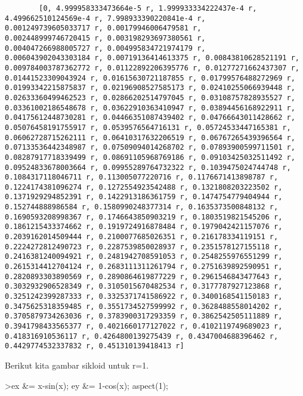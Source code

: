 \documentclass[
]{book}
\begin{document}
\begin{verbatim}
        [0, 4.999958333473664e-5 r, 1.999933334222437e-4 r, 
4.499662510124569e-4 r, 7.998933390220841e-4 r, 
0.001249739605033717 r, 0.00179946006479581 r, 
0.002448999746720415 r, 0.003198293697380561 r, 
0.004047266988005727 r, 0.004995834721974179 r, 
0.006043902043303184 r, 0.00719136414613375 r, 0.00843810628521191 r, 
0.009784003787362772 r, 0.01122892206395776 r, 0.01277271662437307 r, 
0.01441523309043924 r, 0.01615630721187855 r, 0.01799576488272969 r, 
0.01993342215875837 r, 0.02196908527585173 r, 0.02410255066939448 r, 
0.02633360499462523 r, 0.02866202514797045 r, 0.03108757828935527 r, 
0.03361002186548678 r, 0.03622910363410947 r, 0.03894456168922911 r, 
0.04175612448730281 r, 0.04466351087439402 r, 0.04766643011428662 r, 
0.05076458191755917 r, 0.0539576564716131 r, 0.05724533447165381 r, 
0.06062728715262111 r, 0.06410317632206519 r, 0.06767265439396564 r, 
0.07133536442348987 r, 0.07509094014268702 r, 0.07893900599711501 r, 
0.08287917718339499 r, 0.08691105968769186 r, 0.09103425032511492 r, 
0.09524833678003664 r, 0.09955289764732322 r, 0.1039475024744748 r, 
0.1084317118046711 r, 0.113005077220716 r, 0.1176671413898787 r, 
0.1224174381096274 r, 0.1272554923542488 r, 0.1321808203223502 r, 
0.1371929294852391 r, 0.1422913186361759 r, 0.1474754779404944 r, 
0.152744888986584 r, 0.1580990248377314 r, 0.1635373500848132 r, 
0.1690593208998367 r, 0.1746643850903219 r, 0.1803519821545206 r, 
0.1861215433374662 r, 0.1919724916878484 r, 0.1979042421157076 r, 
0.2039162014509444 r, 0.2100077685026351 r, 0.216178334119151 r, 
0.2224272812490723 r, 0.2287539850028937 r, 0.2351578127155118 r, 
0.2416381240094921 r, 0.2481942708591053 r, 0.2548255976551299 r, 
0.2615314412704124 r, 0.2683111311261794 r, 0.2751639892590951 r, 
0.2820893303890569 r, 0.2890864619877229 r, 0.2961546843477643 r, 
0.3032932906528349 r, 0.3105015670482534 r, 0.3177787927123868 r, 
0.3251242399287333 r, 0.3325371741586922 r, 0.3400168541150183 r, 
0.3475625318359485 r, 0.3551734527599992 r, 0.3628488558014202 r, 
0.3705879734263036 r, 0.3783900317293359 r, 0.3862542505111889 r, 
0.3941798433565377 r, 0.4021660177127022 r, 0.4102119749689023 r, 
0.418316910536117 r, 0.4264800139275439 r, 0.4347004688396462 r, 
0.4429774532337832 r, 0.451310139418413 r]
\end{verbatim}

Berikut kita gambar sikloid untuk r=1.

\textgreater ex \&= x-sin(x); ey \&= 1-cos(x); aspect(1);
\end{document}
